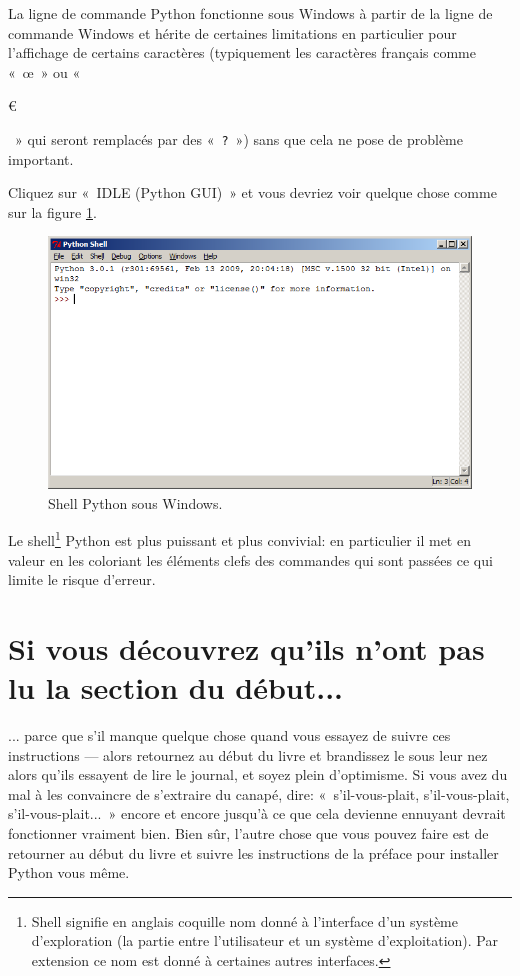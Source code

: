 La ligne de commande Python fonctionne sous Windows à partir de la ligne de commande Windows et hérite de certaines limitations en particulier pour l'affichage de certains caractères (typiquement les caractères français comme «~œ~» ou  «~\begin{small}\euro\end{small}~» qui seront remplacés par des «~\texttt{?}~») sans que cela ne pose de problème important.

Cliquez sur «~IDLE (Python GUI)~» et vous devriez voir quelque chose comme sur la figure \ref{fig:shell}.

\begin{figure}[h!]
\centering
\includegraphics[scale=0.6]{images/shell}
\caption{Shell Python sous Windows.}\label{fig:shell}
\end{figure}

Le shell\footnote{Shell signifie en anglais coquille nom donné à l'interface d'un système d'exploration (la partie entre l'utilisateur et un système d'exploitation). Par extension ce nom est donné à certaines autres interfaces.} Python est plus puissant et plus convivial: en particulier il met en valeur en les coloriant les éléments clefs des commandes qui sont passées ce qui limite le risque d'erreur.

\section*{Si vous découvrez qu'ils n'ont pas lu la section du début...}

... parce que s'il manque quelque chose quand vous essayez de suivre ces instructions --- alors retournez au début du livre et brandissez le sous leur nez alors qu'ils essayent de lire le journal, et soyez plein d'optimisme. Si vous avez du mal à les convaincre de s'extraire du canapé, dire: «~s'il-vous-plait, s'il-vous-plait, s'il-vous-plait...~» encore et encore jusqu'à ce que cela devienne ennuyant devrait fonctionner vraiment bien. Bien sûr, l'autre chose que vous pouvez faire est de retourner au début du livre et suivre les instructions de la préface pour installer Python vous même.

